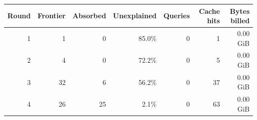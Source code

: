 \begin{tabular}{r r r r r r r}\toprule
\textbf{Round} & \textbf{Frontier} & \textbf{Absorbed} & \textbf{Unexplained} & \textbf{Queries} & \textbf{Cache hits} & \textbf{Bytes billed}\\\midrule
1 & 1 & 0 & 85.0\% & 0 & 1 & 0.00 GiB\\
2 & 4 & 0 & 72.2\% & 0 & 5 & 0.00 GiB\\
3 & 32 & 6 & 56.2\% & 0 & 37 & 0.00 GiB\\
4 & 26 & 25 & 2.1\% & 0 & 63 & 0.00 GiB\\
\bottomrule\end{tabular}

